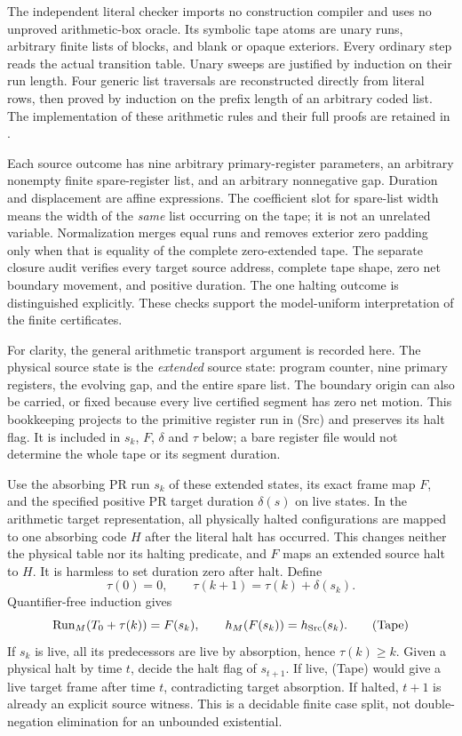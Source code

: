 The independent literal checker imports no construction compiler and
uses no unproved arithmetic-box oracle.  Its symbolic tape atoms are
unary runs, arbitrary finite lists of blocks, and blank or opaque
exteriors.  Every ordinary step reads the actual transition table.
Unary sweeps are justified by induction on their run length.  Four
generic list traversals are reconstructed directly from literal rows,
then proved by induction on the prefix length of an arbitrary coded list.
The implementation of these arithmetic rules and their full proofs are
retained in .

Each source outcome has nine arbitrary primary-register parameters, an
arbitrary nonempty finite spare-register list, and an arbitrary
nonnegative gap.  Duration and displacement are affine expressions.
The coefficient slot for spare-list width means the width of the
\emph{same} list occurring on the tape; it is not an unrelated variable.
Normalization merges equal runs and removes exterior zero padding only
when that is equality of the complete zero-extended tape.  The separate
closure audit verifies every target source address, complete tape shape,
zero net boundary movement, and positive duration.  The one halting
outcome is distinguished explicitly.  These checks support the
model-uniform interpretation of the finite certificates.

For clarity, the general arithmetic transport argument is recorded here.
The physical source state is the \emph{extended} source state: program
counter, nine primary registers, the evolving gap, and the entire spare
list.  The boundary origin can also be carried, or fixed because every
live certified segment has zero net motion.  This bookkeeping projects
to the primitive register run in (Src) and preserves its halt flag.
It is included in $s_k$, $F$, $\delta$ and $\tau$ below; a bare register
file would not determine the whole tape or its segment duration.

Use the absorbing PR run $s_k$ of these extended states, its exact frame
map $F$, and the specified positive PR target duration $\delta(s)$ on
live states.  In the arithmetic target representation, all physically
halted configurations are mapped to one absorbing code $H$ after the
literal halt has occurred.  This changes neither the physical table nor
its halting predicate, and $F$ maps an extended source halt to $H$.
It is harmless to set duration zero after halt.  Define
\[
 \tau(0)=0,\qquad \tau(k+1)=\tau(k)+\delta(s_k).
\]
Quantifier-free induction gives
\[
 \operatorname{Run}_{M}(T_0+\tau(k))=F(s_k),
 \qquad h_M(F(s_k))=h_{\rm Src}(s_k).
 \tag{Tape}
\]
If $s_k$ is live, all its predecessors are live by absorption, hence
$\tau(k)\ge k$.  Given a physical halt by time $t$, decide the halt
flag of $s_{t+1}$.  If live, (Tape) would give a live target frame after
time $t$, contradicting target absorption.  If halted, $t+1$ is already
an explicit source witness.  This is a decidable finite case split, not
double-negation elimination for an unbounded existential.

